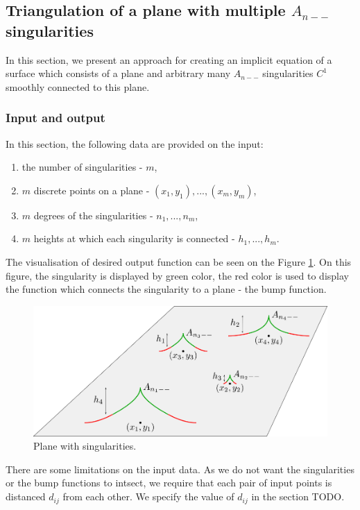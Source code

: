 \subsection*{Triangulation of a plane with multiple $A_{n--}$ singularities}
In this section, we present an approach for creating an implicit equation of a
surface which consists of a plane and arbitrary many $A_{n--}$ singularities
$C^1$ smoothly connected to this plane. 
\subsubsection*{Input and output}
In this section, the following data are provided on the input:
\begin{enumerate}
    \item the number of singularities - $m$,
    \item $m$ discrete points on a plane - $(x_1, y_1), ..., (x_m, y_m)$,
    \item $m$ degrees of the singularities - $n_1, ..., n_m$,
    \item $m$ heights at which each singularity is connected - $h_1, ..., h_m$.
\end{enumerate}
The visualisation of desired output function can be seen on the Figure \ref{img:22}. 
On this figure, the singularity is displayed by green color, the red color is used to
display the function which connects the singularity to a plane - the bump function.
\begin{figure}
    \centerline{\includegraphics[scale=0.5]{images/img22}}
    \caption[Plane with singularities.]
    {Plane with singularities.}
    \label{img:22}
\end{figure}
There are some limitations on the input data. As we do not want the singularities 
or the bump functions to intsect, we require that each pair of input points is
distanced $d_{ij}$ from each other. We specify the value of $d_{ij}$ in the section TODO.
